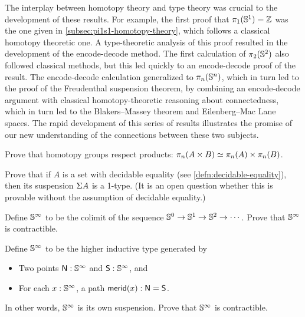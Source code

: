 The interplay between homotopy theory and type theory was crucial to the
development of these results.  For example, the first proof that
$\pi_1(\mathbb{S} ^1)=\mathbb{Z}$ was the one given in \cref{subsec:pi1s1-homotopy-theory}, which follows a classical homotopy theoretic one.  A
type-theoretic analysis of this proof resulted in the development of the
encode-decode method.  The first calculation of $\pi_2(\mathbb{S} ^2)$ also followed
classical methods, but this led quickly to an encode-decode proof of the
result.  The encode-decode calculation generalized to $\pi_n(\mathbb{S} ^n)$, which
in turn led to the proof of the Freudenthal suspension theorem, by
combining an encode-decode argument with classical homotopy-theoretic
reasoning about connectedness, which in turn led to the Blakers--Massey
theorem and Eilenberg--Mac Lane spaces.  The rapid development of this
series of results illustrates the promise of our new understanding of
the connections between these two subjects.

\sectionExercises

\begin{ex}\label{ex:homotopy-groups-resp-prod}
  Prove that homotopy groups respect products: $\pi_n(A\times B) \simeq \pi_n(A)\times \pi_n(B)$.
\end{ex}

\begin{ex}\label{ex:decidable-equality-susp}
  Prove that if $A$ is a set with decidable equality (see \cref{defn:decidable-equality}), then its suspension $\Sigma A$ is a 1-type.
  (It is an open question whether this is provable without the assumption of decidable equality.)
\end{ex}

\begin{ex}\label{ex:contr-infinity-sphere-colim}
  Define $\mathbb{S}^\infty$ to be the colimit of the sequence $\mathbb{S}^0 \to \mathbb{S}^1 \to \mathbb{S}^2 \to\cdots$.
  Prove that $\mathbb{S}^\infty$ is contractible.
\end{ex}

\begin{ex}\label{ex:contr-infinity-sphere-susp}
  Define $\mathbb{S}^\infty$ to be the higher inductive type generated by
  \begin{itemize}
  \item Two points $\mathsf{N}:\mathbb{S}^\infty$ and $\mathsf{S}:\mathbb{S}^\infty$, and
  \item For each $x:\mathbb{S}^\infty$, a path $\mathsf{merid}(x):\mathsf{N}=\mathsf{S}$.
  \end{itemize}
  In other words, $\mathbb{S}^\infty$ is its own suspension.
  Prove that $\mathbb{S}^\infty$ is contractible.
\end{ex}

